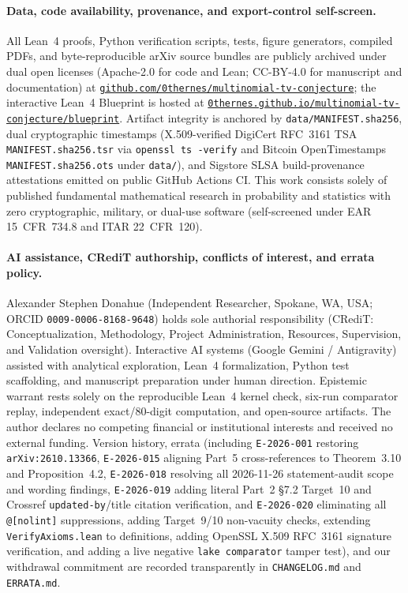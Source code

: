 \documentclass[11pt,a4paper]{article}
\numberwithin{equation}{section}
\theoremstyle{plain}
\theoremstyle{definition}
\theoremstyle{remark}
\newcommand{\code}[1]{\texttt{\small #1}}
\begin{document}
\paragraph{Data, code availability, provenance, and export-control self-screen.}
All Lean~4 proofs, Python verification scripts, tests, figure generators, compiled PDFs, and byte-reproducible arXiv source bundles are publicly archived under dual open licenses (Apache-2.0 for code and Lean; CC-BY-4.0 for manuscript and documentation) at \href{https://github.com/0thernes/multinomial-tv-conjecture}{\nolinkurl{github.com/0thernes/multinomial-tv-conjecture}}; the interactive Lean~4 Blueprint is hosted at \href{https://0thernes.github.io/multinomial-tv-conjecture/blueprint/}{\nolinkurl{0thernes.github.io/multinomial-tv-conjecture/blueprint}}. Artifact integrity is anchored by \code{data/MANIFEST.sha256}, dual cryptographic timestamps (X.509-verified DigiCert RFC~3161 TSA \code{MANIFEST.sha256.tsr} via \code{openssl ts -verify} and Bitcoin OpenTimestamps \code{MANIFEST.sha256.ots} under \code{data/}), and Sigstore SLSA build-provenance attestations emitted on public GitHub Actions CI. This work consists solely of published fundamental mathematical research in probability and statistics with zero cryptographic, military, or dual-use software (self-screened under EAR 15~CFR~734.8 and ITAR 22~CFR~120).

\paragraph{AI assistance, CRediT authorship, conflicts of interest, and errata policy.}
Alexander Stephen Donahue (Independent Researcher, Spokane, WA, USA; ORCID \code{0009-0006-8168-9648}) holds sole authorial responsibility (CRediT: Conceptualization, Methodology, Project Administration, Resources, Supervision, and Validation oversight). Interactive AI systems (Google Gemini / Antigravity) assisted with analytical exploration, Lean~4 formalization, Python test scaffolding, and manuscript preparation under human direction. Epistemic warrant rests solely on the reproducible Lean~4 kernel check, six-run comparator replay, independent exact/80-digit computation, and open-source artifacts. The author declares no competing financial or institutional interests and received no external funding. Version history, errata (including \code{E-2026-001} restoring \code{arXiv:2610.13366}, \code{E-2026-015} aligning Part~5 cross-references to Theorem~3.10 and Proposition~4.2, \code{E-2026-018} resolving all 2026-11-26 statement-audit scope and wording findings, \code{E-2026-019} adding literal Part~2 \S7.2 Target~10 and Crossref \code{updated-by}/title citation verification, and \code{E-2026-020} eliminating all \code{@[nolint]} suppressions, adding Target~9/10 non-vacuity checks, extending \code{VerifyAxioms.lean} to definitions, adding OpenSSL X.509 RFC~3161 signature verification, and adding a live negative \code{lake comparator} tamper test), and our withdrawal commitment are recorded transparently in \code{CHANGELOG.md} and \code{ERRATA.md}.



\end{document}
